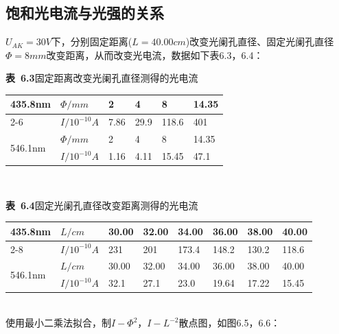 \documentclass{article}
\def\kong{\hspace*{2em}}
\begin{document}
    \subsection{饱和光电流与光强的关系}
        \kong $U_{AK}=30V$下，分别固定距离($L=40.00cm$)改变光阑孔直径、固定光阑孔直径$\Phi=8mm$改变距离，从而改变光电流，数据如下表6.3，6.4：\\[12pt]
        \begin{minipage}{1\linewidth}
            \centering
            \textbf{表\ 6.3}\quad 固定距离改变光阑孔直径测得的光电流  \\[4pt]
            \begin{tabular}{|l|l|l|l|l|l|}
                \hline
                \multirow{2}{*}{435.8nm} & $\Phi/mm$     & 2    & 4    & 8     & 14.35 \\ \cline{2-6} 
                                         & $I/10^{-10}A$ & 7.86 & 29.9 & 118.6 & 401   \\ \hline
                \multirow{2}{*}{546.1nm} & $\Phi/mm$     & 2    & 4    & 8     & 14.35 \\ \cline{2-6} 
                                         & $I/10^{-10}A$ & 1.16 & 4.11 & 15.45 & 47.1  \\ \hline
            \end{tabular}
        \end{minipage}\\[12pt]
        \begin{minipage}{1\linewidth}
            \centering
            \textbf{表\ 6.4}\quad 固定光阑孔直径改变距离测得的光电流  \\[4pt]
            \begin{tabular}{|l|l|l|l|l|l|l|l|}
                \hline
                \multirow{2}{*}{435.8nm} & $L/cm$        & 30.00& 32.00& 34.00 & 36.00 & 38.00 & 40.00 \\ \cline{2-8} 
                                         & $I/10^{-10}A$ & 231  & 201  & 173.4 & 148.2 & 130.2 & 118.6 \\ \hline
                \multirow{2}{*}{546.1nm} & $L/cm$        & 30.00& 32.00& 34.00 & 36.00 & 38.00 & 40.00 \\ \cline{2-8} 
                                         & $I/10^{-10}A$ & 32.1 & 27.1 & 23.0  & 19.64 & 17.22 & 15.45 \\ \hline
            \end{tabular}
        \end{minipage}\\[12pt]
        使用最小二乘法拟合，制$I-\Phi^2$，$I-L^{-2}$散点图，如图6.5，6.6：\\[12pt]
\end{document}
